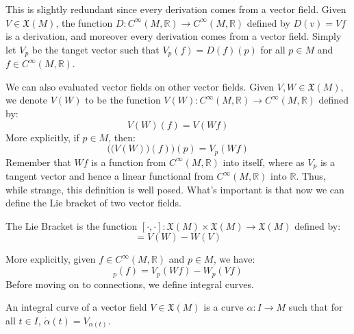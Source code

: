 \documentclass{article}                                                        %
\begin{document}
        This is slightly redundant since every derivation comes from a vector
        field. Given $V\in\mathfrak{X}(M)$, the function
        $D:C^{\infty}(M,\mathbb{R})\rightarrow{C}^{\infty}(M,\mathbb{R})$
        defined by $D(v)=Vf$ is a derivation, and moreover every derivation
        comes from a vector field. Simply let $V_{p}$ be the tanget vector such
        that $V_{p}(f)=D(f)(p)$ for all $p\in{M}$ and
        $f\in{C}^{\infty}(M,\mathbb{R})$. 
        \par\hfill\par
        We can also evaluated vector fields on other vector fields. Given
        $V,W\in\mathfrak{X}(M)$, we denote $V(W)$ to be the function
        $V(W):C^{\infty}(M,\mathbb{R})\rightarrow{C}^{\infty}(M,\mathbb{R})$
        defined by:
        \begin{equation}
            V(W)(f)=V(Wf)
        \end{equation}
        More explicitly, if $p\in{M}$, then:
        \begin{equation}
            \Big(\big(V(W)\big)(f)\Big)(p)=V_{p}(Wf)
        \end{equation}
        Remember that $Wf$ is a function from $C^{\infty}(M,\mathbb{R})$ into
        itself, where as $V_{p}$ is a tangent vector and hence a linear
        functional from $C^{\infty}(M,\mathbb{R})$ into $\mathbb{R}$. Thus,
        while strange, this definition is well posed. What's important is that
        now we can define the Lie bracket of two vector fields.
        \begin{definition}
            The Lie Bracket is the function
            $[\cdot,\cdot]:\mathfrak{X}(M)\times\mathfrak{X}(M)%
             \rightarrow\mathfrak{X}(M)$ defined by:
            \begin{equation}
                [V,W]=V(W)-W(V)
            \end{equation}
        \end{definition}
        More explicitly, given $f\in{C}^{\infty}(M,\mathbb{R})$ and $p\in{M}$,
        we have:
        \begin{equation}
            [V,W]_{p}(f)=V_{p}(Wf)-W_{p}(Vf)
        \end{equation}
        Before moving on to connections, we define integral curves.
        \begin{definition}
            An integral curve of a vector field $V\in\mathfrak{X}(M)$ is a
            curve $\alpha:I\rightarrow{M}$ such that for all $t\in{I}$,
            $\dot{\alpha}(t)=V_{\alpha(t)}$.
        \end{definition}
\end{document}
